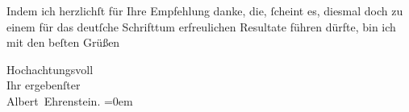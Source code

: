 \pstart
           Indem ich herzlichſt für Ihre Empfehlung danke, die,{ }ſcheint es, diesmal doch zu
               einem für das deutſche Schrifttum erfreulichen Resultate führen dürfte, bin ich mit den beſten Grüßen\pend
           
\pstart
           Hochachtungsvoll{\\[\baselineskip]}Ihr ergebenſter{\\[\baselineskip]}\spacefill\mbox{Albert Ehrenstein.}\pend
           \leftskip=0em{}\endnumbering{}  \newcommand{\dateiname}{L01912}\newcommand{\titel}{Albert Ehrenstein an Arthur Schnitzler, 10. 2. 1910}\newcommand{\editorInnen}{Martin Anton Müller und Gerd-Hermann Susen}
